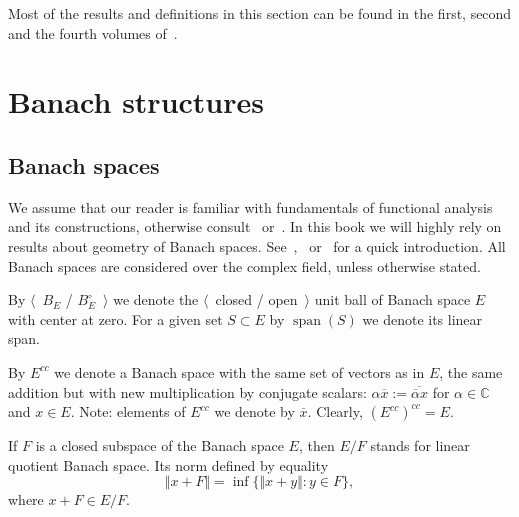 Most of the results and definitions in this section can be found in the first,
second and the fourth volumes of~\cite{FremMeasTh}.


\section{
  Banach structures}\label{SectionBanachStructures}


\subsection{
  Banach spaces}\label{SubSectionBanachSpaces}

We assume that our reader is familiar with fundamentals of functional analysis
and its constructions, otherwise consult~\cite{HelLectAndExOnFuncAn}
or~\cite{ConwACoursInFuncAn}. In this book we will highly rely on results about
geometry of Banach spaces.
See~\cite{CarothShortCourseBanSp},~\cite{KalAlbTopicsBanSpTh}
or~\cite{FabHabBanSpTh} for a quick introduction. All Banach spaces are
considered over the complex field, unless otherwise stated. 

By $\langle$~$B_E$ / $B_E^\circ$~$\rangle$ we denote the $\langle$~closed /
open~$\rangle$ unit ball of Banach space $E$ with center at zero. For a given 
set $S\subset E$ by $\operatorname{span}(S)$ we denote its linear span. 

By $E^{cc}$ we denote a Banach space with the same set of vectors as in $E$, the
same addition but with new multiplication by conjugate scalars:  $\alpha
\overline{x}:=\overline{\overline{\alpha}x}$ for $\alpha\in\mathbb{C}$ 
and $x\in E$. Note: elements of $E^{cc}$ we denote by $\overline{x}$. Clearly,
${(E^{cc})}^{cc}=E$.

If $F$ is a closed subspace of the Banach space $E$, then $E/F$ stands for 
linear quotient Banach space. Its norm defined by equality 
$$
\Vert x+F\Vert=\inf \{\Vert x+y\Vert: y\in F \},
$$
where $x+F\in E/F$.

